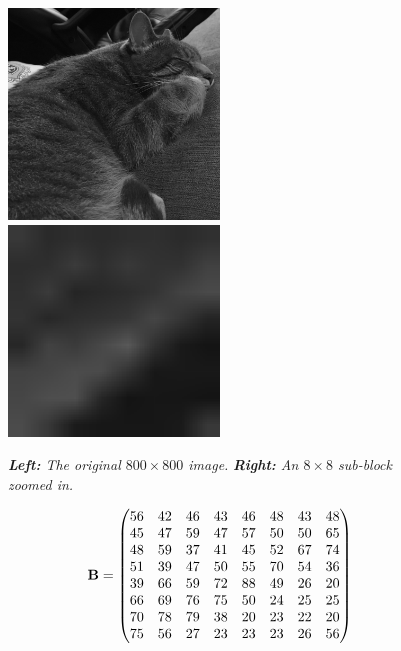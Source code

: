 \begin{figure}
\label{fig:charles}
	\includegraphics[width=0.5\textwidth]{chap4/figures/charles_gray.png}
	\includegraphics[width=0.5\textwidth]{chap4/figures/charles_block.png}
	\caption{{\em{\bf Left:} The original $800 \times 800$ image.} {\em{\bf Right:} An $8 \times 8$ sub-block zoomed in.}}
\end{figure}

\begin{equation}
\label{eq:subblock}
	\mathbf{B} = \begin{pmatrix}
	56 & 42 &	46 &	43 &	46 & 48 &	43 &	48\\
	45 &	47 &	59 & 	47 &	57 &	50 &	50 &	65\\
	48 &	59 &	37 &	41 &	45 &	52 &	67 &	74\\
	51 &	39 &	47 &	50 &	55 &	70 &	54 &	36\\
	39 &	66 &	59 &	72 &	88 &	49 &	26 &	20\\
	66 &	69 &	76 &	75 &	50 &	24 &	25 &	25\\
	70 &	78 &	79 &	38 &	20 &	23 &	22 &	20\\
	75 &	56 &	27 &	23 &	23 &	23 &	26 &	56
	\end{pmatrix}
\end{equation}

